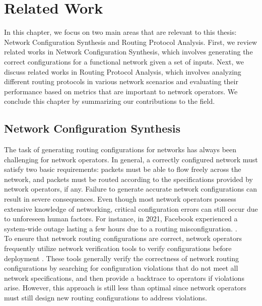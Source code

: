 \documentclass{uiucthesis2021}
\begin{document}
\chapter{Related Work}
\label{c2}
\noindent In this chapter, we focus on two main areas that are relevant to this thesis: Network Configuration Synthesis and Routing Protocol Analysis. First, we review related works in Network Configuration Synthesis, which involves generating the correct configurations for a functional network given a set of inputs. Next, we discuss related works in Routing Protocol Analysis, which involves analyzing different routing protocols in various network scenarios and evaluating their performance based on metrics that are important to network operators. We conclude this chapter by summarizing our contributions to the field.

\section{Network Configuration Synthesis}
\noindent The task of generating routing configurations for networks has always been challenging for network operators. In general, a correctly configured network must satisfy two basic requirements: packets must be able to flow freely across the network, and packets must be routed according to the specifications provided by network operators, if any. Failure to generate accurate network configurations can result in severe consequences. Even though most network operators possess extensive knowledge of networking, critical configuration errors can still occur due to unforeseen human factors. For instance, in 2021, Facebook experienced a system-wide outage lasting a few hours due to a routing misconfiguration. \cite{isaac_2021}.\\

\noindent To ensure that network routing configurations are correct, network operators frequently utilize network verification tools to verify configurations before deployment \cite{10.1145/3098822.3098834,10.5555/2789770.2789803}. These tools generally verify the correctness of network routing configurations by searching for configuration violations that do not meet all network specifications, and then provide a backtrace to operators if violations arise. However, this approach is still less than optimal since network operators must still design new routing configurations to address violations. \\
\end{document}
